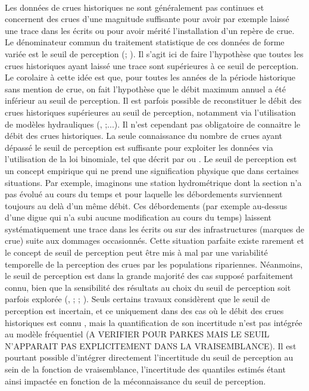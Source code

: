 \documentclass[11pt]{article}
\begin{document}
	\paragraph{} Les données de crues historiques ne sont généralement pas continues et concernent des crues d'une magnitude suffisante pour avoir par exemple laissé une trace dans les écrits ou pour avoir mérité l'installation d'un repère de crue. Le dénominateur commun du traitement statistique de ces données de forme variée est le seuil de perception (\cite{gerard_probability_1979}; \cite{stedinger_flood_1986}). Il s'agit ici de faire l'hypothèse que toutes les crues historiques ayant laissé une trace sont supérieures à ce seuil de perception. Le corolaire à cette idée est que, pour toutes les années de la période historique sans mention de crue, on fait l'hypothèse que le débit maximum annuel a été inférieur au seuil de perception. Il est parfois possible de reconstituer le débit des crues historiques supérieures au seuil de perception, notamment via l'utilisation de modèles hydrauliques (\cite{neppel_flood_2010}, \cite{machado_flood_2015};...). Il n'est cependant pas obligatoire de connaitre le débit des crues historiques. La seule connaissance du nombre de crues ayant dépassé le seuil de perception est suffisante pour exploiter les données via l'utilisation de la loi binomiale, tel que décrit par \cite{stedinger_flood_1986} ou \cite{payrastre_usefulness_2011}. Le seuil de perception est un concept empirique qui ne prend une signification physique que dans certaines situations. Par exemple, imaginons une station hydrométrique dont la section n'a pas évolué au cours du temps et pour laquelle les débordements surviennent toujours au delà d'un même débit. Ces débordements (par exemple au-dessus d'une digue qui n'a subi aucune modification au cours du temps) laissent systématiquement une trace dans les écrits ou sur des infrastructures (marques de crue) suite aux dommages occasionnés. Cette situation parfaite existe rarement et le concept de seuil de perception peut être mis à mal par une variabilité temporelle de la perception des crues par les populations ripariennes. Néanmoins, le seuil de perception est dans la grande majorité des cas supposé parfaitement connu, bien que la sensibilité des résultats au choix du seuil de perception soit parfois explorée (\cite{stedinger_flood_1986}, \cite{viglione_flood_2013}; \cite{macdonald_reassessing_2014}; \cite{payrastre_usefulness_2011}). Seuls certains travaux considèrent que le seuil de perception est incertain, et ce uniquement dans des cas où le débit des crues historiques est connu \cite{parkes_defining_2016}, mais la quantification de son incertitude n'est pas intégrée au modèle fréquentiel (A VERIFIER POUR PARKES MAIS LE SEUIL N'APPARAIT PAS EXPLICITEMENT DANS LA VRAISEMBLANCE). Il est pourtant possible d'intégrer directement l'incertitude du seuil de perception au sein de la fonction de vraisemblance, l'incertitude des quantiles estimés étant ainsi impactée en fonction de la méconnaissance du seuil de perception. 
\end{document}
